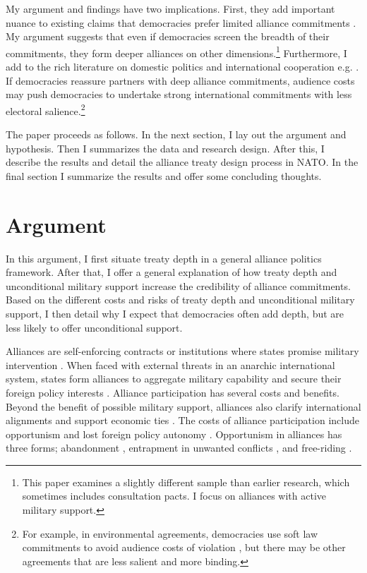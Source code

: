 \documentclass[12pt]{article}
\begin{document}
My argument and findings have two implications. 
First, they add important nuance to existing claims that democracies prefer limited alliance commitments \citep{Mattes2012, Chibaetal2015, FjelstulReiter2019}. 
My argument suggests that even if democracies screen the breadth of their commitments, they form deeper alliances on other dimensions.\footnote{This paper examines a slightly different sample than earlier research, which sometimes includes consultation pacts. I focus on alliances with active military support.}  
Furthermore, I add to the rich literature on domestic politics and international cooperation e.g. \citep{DownesRocke1995, Fearon1998, Leeds1999, MattesRodriguez2014}. 
If democracies reassure partners with deep alliance commitments, audience costs may push democracies to undertake strong international commitments with less electoral salience.\footnote{For example, in environmental agreements, democracies use soft law commitments to avoid audience costs of violation \citep{BoehmeltButkute2018}, but there may be other agreements that are less salient and more binding.} 


The paper proceeds as follows. 
In the next section, I lay out the argument and hypothesis. 
Then I summarizes the data and research design. 
After this, I describe the results and detail the alliance treaty design process in NATO.
In the final section I summarize the results and offer some concluding thoughts. 


\section{Argument}


In this argument, I first situate treaty depth in a general alliance politics framework.  
After that, I offer a general explanation of how treaty depth and unconditional military support increase the credibility of alliance commitments. 
Based on the different costs and risks of treaty depth and unconditional military support, I then detail why I expect that democracies often add depth, but are less likely to offer unconditional support. 


Alliances are self-enforcing contracts or institutions where states promise military intervention \citep{Leedsetal2002, Morrow2000}. 
When faced with external threats in an anarchic international system, states form alliances to aggregate military capability and secure their foreign policy interests \citep{Altfield1984, Smith1995, Snyder1997, FordhamPoast2014}.
Alliance participation has several costs and benefits.
Beyond the benefit of possible military support, alliances also clarify international alignments \citep{Snyder1990} and support economic ties \citep{Gowa1995, Li2003, Long2003, Fordham2010, WolfordKim2017}.  
The costs of alliance participation include opportunism and lost foreign policy autonomy \citep{Altfield1984, Morrow2000, Johnson2015}. 
Opportunism in alliances has three forms; abandonment \citep{Leeds2003a, BerkemeierFuhrmann2018}, entrapment in unwanted conflicts \citep{Snyder1984}, and free-riding \citep{Morrow2000}.
\end{document}
